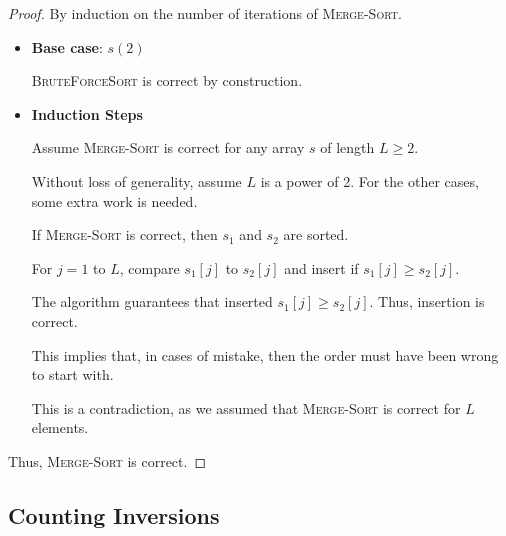 \begin{proof}
    By induction on the number of iterations of \textsc{Merge-Sort}.

    \begin{itemize}
        \item \textbf{Base case}: $s(2)$
        
        \textsc{BruteForceSort} is correct by construction.

        \item \textbf{Induction Steps}
        
        Assume \textsc{Merge-Sort} is correct for any array $s$ of length $L \ge 2$. 

        Without loss of generality, assume $L$ is a power of 2. For the other cases, some extra work is needed.
        
        \begin{center}
        \end{center}

        If \textsc{Merge-Sort} is correct, then $s_1$ and $s_2$ are sorted.

        For $j = 1$ to $L$, compare $s_1[j]$ to $s_2[j]$ and insert if $s_1[j] \ge s_2[j]$.

        The algorithm guarantees that inserted $s_1[j] \ge s_2[j]$. Thus, insertion is correct.

        This implies that, in cases of mistake, then the order must have been wrong to start with. 

        This is a contradiction, as we assumed that \textsc{Merge-Sort} is correct for $L$ elements.
    \end{itemize}

    Thus, \textsc{Merge-Sort} is correct. 
\end{proof}

\subsection{Counting Inversions}


